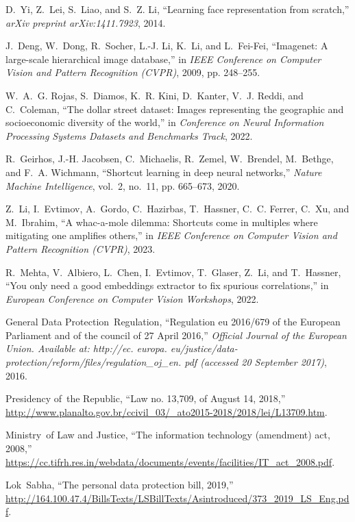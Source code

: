 \documentclass[journal]{IEEEtran}
\begin{document}
\begin{thebibliography}{100}
D.~Yi, Z.~Lei, S.~Liao, and S.~Z. Li, ``Learning face representation from
  scratch,'' \emph{arXiv preprint arXiv:1411.7923}, 2014.

J.~Deng, W.~Dong, R.~Socher, L.-J. Li, K.~Li, and L.~Fei-Fei, ``Imagenet: A
  large-scale hierarchical image database,'' in \emph{IEEE Conference on Computer Vision and Pattern Recognition (CVPR)}, 2009, pp. 248--255.

W.~A.~G. Rojas, S.~Diamos, K.~R. Kini, D.~Kanter, V.~J. Reddi, and C.~Coleman,
  ``The dollar street dataset: Images representing the geographic and socioeconomic diversity of the world,'' in \emph{Conference on Neural
  Information Processing Systems Datasets and Benchmarks Track}, 2022.

R.~Geirhos, J.-H. Jacobsen, C.~Michaelis, R.~Zemel, W.~Brendel, M.~Bethge, and
  F.~A. Wichmann, ``Shortcut learning in deep neural networks,'' \emph{Nature
  Machine Intelligence}, vol.~2, no.~11, pp. 665--673, 2020.

Z.~Li, I.~Evtimov, A.~Gordo, C.~Hazirbas, T.~Hassner, C.~C. Ferrer, C.~Xu, and
  M.~Ibrahim, ``A whac-a-mole dilemma: Shortcuts come in multiples where
  mitigating one amplifies others,'' in \emph{IEEE Conference on Computer Vision and Pattern
  Recognition (CVPR)}, 2023.

R.~Mehta, V.~Albiero, L.~Chen, I.~Evtimov, T.~Glaser, Z.~Li, and T.~Hassner,
  ``You only need a good embeddings extractor to fix spurious correlations,''
  in \emph{European Conference on Computer Vision Workshops}, 2022.

\relax General Data Protection~Regulation, ``Regulation eu 2016/679 of the
  European Parliament and of the council of 27 April 2016,'' \emph{Official
  Journal of the European Union. Available at: http://ec. europa.
  eu/justice/data-protection/reform/files/regulation\_oj\_en. pdf (accessed 20
  September 2017)}, 2016.

\relax Presidency of~the Republic, ``Law no. 13,709, of August 14, 2018,''
  \url{http://www.planalto.gov.br/ccivil_03/_ato2015-2018/2018/lei/L13709.htm}.

\relax Ministry~of Law and Justice, ``The information technology (amendment)
  act, 2008,''
  \url{https://cc.tifrh.res.in/webdata/documents/events/facilities/IT_act_2008.pdf}.

\relax Lok~Sabha, ``The personal data protection bill, 2019,''
  \url{http://164.100.47.4/BillsTexts/LSBillTexts/Asintroduced/373_2019_LS_Eng.pdf}.


\end{thebibliography}
\end{document}
